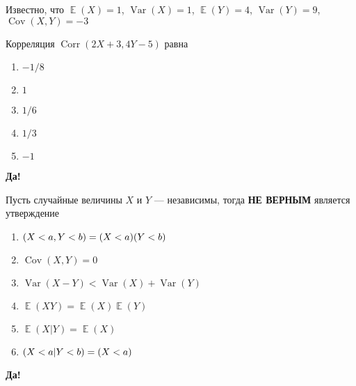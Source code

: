 \documentclass[t]{beamer}
\DeclareMathOperator{\Var}{Var}
\DeclareMathOperator{\Cov}{Cov}
\DeclareMathOperator{\Corr}{Corr}
\DeclareMathOperator{\E}{\mathbb{E}}
\let\P\relax
\DeclareMathOperator{\P}{\mathbb{P}}
\begin{document}
 \begin{frame} \label{25-Yes} 
\begin{block}{25} 

Известно, что $\E(X)=1$, $\Var(X)=1$, $\E(Y)=4$, $\Var(Y)=9$, $\Cov(X,Y)=-3$

\vspace{0.5cm} 
 
 
Корреляция $\Corr(2X+3,4Y-5)$ равна
 


 \end{block} 
\begin{enumerate} 
\item[] \hyperlink{25-No}{\beamergotobutton{} $-1/8$}
\item[] \hyperlink{25-No}{\beamergotobutton{} $1$}
\item[] \hyperlink{25-No}{\beamergotobutton{} $1/6$
}
\item[] \hyperlink{25-No}{\beamergotobutton{} $1/3$}
\item[] \hyperlink{25-Yes}{\beamergotobutton{} $-1$}
\end{enumerate} 

 \textbf{Да!} 
 \hyperlink{26}{}\end{frame} 


 \begin{frame} \label{26-Yes} 
\begin{block}{26} 

Пусть случайные величины $X$ и $Y$ — независимы, тогда \textbf{НЕ ВЕРНЫМ} является утверждение
 


 \end{block} 
\begin{enumerate} 
\item[] \hyperlink{26-No}{\beamergotobutton{} $\P(X<a, Y<b)=\P(X<a)\P(Y<b)$}
\item[] \hyperlink{26-No}{\beamergotobutton{} $\Cov(X,Y) = 0$}
\item[] \hyperlink{26-Yes}{\beamergotobutton{} $\Var(X-Y)<\Var(X)+\Var(Y)$ }
\item[] \hyperlink{26-No}{\beamergotobutton{} $\E(XY)=\E(X)\E(Y)$}
\item[] \hyperlink{26-No}{\beamergotobutton{} $\E(X|Y)=\E(X)$}
\item[] \hyperlink{26-No}{\beamergotobutton{} $\P(X<a | Y<b)=\P(X<a)$}
\end{enumerate} 

 \textbf{Да!} 
 \hyperlink{27}{}\end{frame} 
\end{document}
